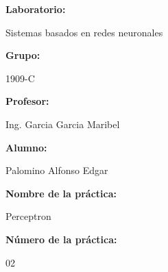 \documentclass[a4paper]{article}
\begin{document}
    \begin{titlepage}
        \centering
        \par\vspace{0.5cm}

        \par\vspace{1cm}

        \raggedright{\huge\textbf{Laboratorio:}}
        \par\vspace{0.5cm}
        \centering
        {\huge{Sistemas basados en redes neuronales}}
        \par\vspace{0.5cm}

        \raggedright{\huge\textbf{Grupo:}}
        \par\vspace{0.5cm}
        \centering
        {\huge{1909-C}}
        \par\vspace{0.5cm}

        \raggedright{\huge\textbf{Profesor:}}
        \par\vspace{0.5cm}
        \centering
        {\huge{Ing. Garcia Garcia Maribel}}
        \par\vspace{0.5cm}

        \raggedright{\huge\textbf{Alumno:}}
        \par\vspace{0.5cm}
        \centering
        {\huge{Palomino Alfonso Edgar}}
        \par\vspace{0.5cm}

        \raggedright{\huge\textbf{Nombre de la práctica:}}
        \par\vspace{0.5cm}
        \centering
        {\huge{Perceptron}}
        \par\vspace{0.5cm}

        \raggedright{\huge\textbf{Número de la práctica:}}
        \par\vspace{0.5cm}
        \centering
        {\huge{02}}
        \par\vspace{0.5cm}


\end{titlepage}
\end{document}
